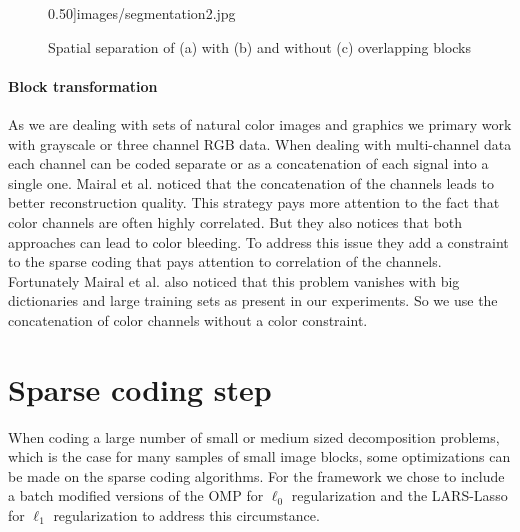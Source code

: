 \begin{figure}[h]
{0.50]{images/segmentation2.jpg}}
\hspace{5mm}
\caption[Spatial separation]{Spatial separation of (a) with (b) and without (c)
overlapping blocks}\label{fig:separation}
\end{figure}

\paragraph{Block transformation} As we are dealing with sets of natural
color images and graphics we primary work with grayscale or three
channel RGB data. 
When dealing with multi-channel data each channel can be coded
separate or as a concatenation of each signal into a single one. Mairal et
al.\cite{mairal08sparse} noticed that the concatenation of the channels leads
to better reconstruction quality. This strategy pays more attention to the fact
that color channels are often highly correlated. But they also notices that both
approaches can lead to color bleeding.  
To address this issue they add a constraint to the sparse coding that pays
attention to correlation of the channels. 
Fortunately Mairal et al. also noticed that this problem vanishes with big
dictionaries and large training sets as present in our experiments. So we use
the concatenation of color channels without a color constraint. 

\begin{figure}[h]
\centering
\label{fig:channel_concat}
\end{figure}


\section{Sparse coding step}
When coding a large number of small or medium sized decomposition problems,
which is the case for many samples of small image blocks, some optimizations can
be made on the sparse coding algorithms. 
For the framework we chose to include a batch modified versions of the OMP for
$\ell_0$ regularization and the LARS-Lasso for $\ell_1$ regularization to
address this circumstance.

